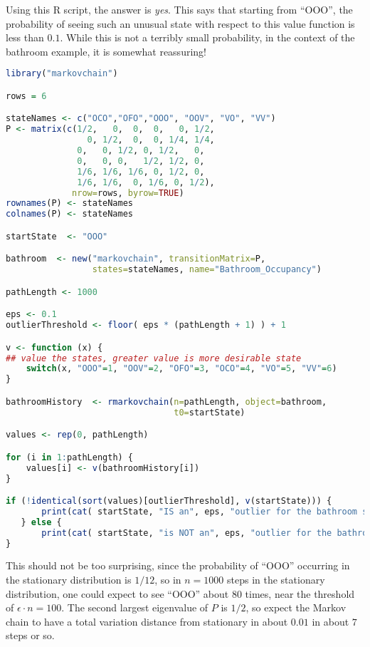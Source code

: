 \documentclass[12pt]{article}
\begin{document}
\begin{solution}
  Using this R script, the answer is \emph{yes}.  This says that starting from
  ``OOO'', the probability of seeing such an unusual state with respect to
  this value function is less than $0.1$.  While this is not a
  terribly small probability, in the context of the bathroom example,
  it is somewhat reassuring!

  \begin{lstlisting}[language=R]
library("markovchain")

rows = 6

stateNames <- c("OCO","OFO","OOO", "OOV", "VO", "VV")
P <- matrix(c(1/2,   0,  0,  0,   0, 1/2,
                0, 1/2,  0,  0, 1/4, 1/4,
              0,   0, 1/2, 0, 1/2,   0,
              0,   0, 0,   1/2, 1/2, 0,
              1/6, 1/6, 1/6, 0, 1/2, 0,
              1/6, 1/6,  0, 1/6, 0, 1/2), 
             nrow=rows, byrow=TRUE)
rownames(P) <- stateNames
colnames(P) <- stateNames

startState  <- "OOO"

bathroom  <- new("markovchain", transitionMatrix=P,
                 states=stateNames, name="Bathroom_Occupancy")

pathLength <- 1000

eps <- 0.1
outlierThreshold <- floor( eps * (pathLength + 1) ) + 1

v <- function (x) {
## value the states, greater value is more desirable state
    switch(x, "OOO"=1, "OOV"=2, "OFO"=3, "OCO"=4, "VO"=5, "VV"=6)
}    

bathroomHistory  <- rmarkovchain(n=pathLength, object=bathroom,
                                 t0=startState)

values <- rep(0, pathLength)

for (i in 1:pathLength) {
    values[i] <- v(bathroomHistory[i])
}    

if (!identical(sort(values)[outlierThreshold], v(startState))) {
       print(cat( startState, "IS an", eps, "outlier for the bathroom states\n"))
   } else {
       print(cat( startState, "is NOT an", eps, "outlier for the bathroom states\n"))
}
\end{lstlisting}

This should not be too surprising, since the probability of ``OOO''
occurring in the stationary distribution is $1/12$, so in $n=1000$  steps
in the stationary distribution, one could expect to see ``OOO'' about
$80$ times, near the threshold of $\epsilon \cdot n = 100$.  The
second largest eigenvalue of $P$ is $1/2$, so expect the Markov chain to have a
total variation distance from stationary in about $0.01$ in about $7$
steps or so.
\end{solution}
\end{document}
